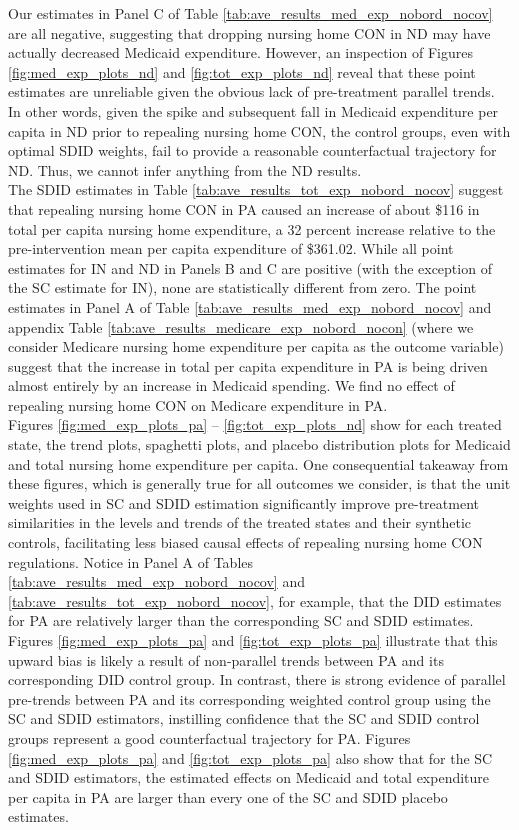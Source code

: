 \documentclass[../Main.tex]{subfiles}
\begin{document}
\indent Our estimates in Panel C of Table \ref{tab:ave_results_med_exp_nobord_nocov} are all negative, suggesting that dropping nursing home CON in ND may have actually decreased Medicaid expenditure. However, an inspection of Figures \ref{fig:med_exp_plots_nd} and \ref{fig:tot_exp_plots_nd} reveal that these point estimates are unreliable given the obvious lack of pre-treatment parallel trends. In other words, given the spike and subsequent fall in Medicaid expenditure per capita in ND prior to repealing nursing home CON, the control groups, even with optimal SDID weights, fail to provide a reasonable counterfactual trajectory for ND. Thus, we cannot infer anything from the ND results.\\
\indent The SDID estimates in Table \ref{tab:ave_results_tot_exp_nobord_nocov} suggest that repealing nursing home CON in PA caused an increase of about \$116 in total per capita nursing home expenditure, a 32 percent increase relative to the pre-intervention mean per capita expenditure of \$361.02. While all point estimates for IN and ND in Panels B and C are positive (with the exception of the SC estimate for IN), none are statistically different from zero. The point estimates in Panel A of Table \ref{tab:ave_results_med_exp_nobord_nocov} and appendix Table \ref{tab:ave_results_medicare_exp_nobord_nocon} (where we consider Medicare nursing home expenditure per capita as the outcome variable) suggest that the increase in total per capita expenditure in PA is being driven almost entirely by an increase in Medicaid spending. We find no effect of repealing nursing home CON on Medicare expenditure in PA. \\
\indent Figures \ref{fig:med_exp_plots_pa} -- \ref{fig:tot_exp_plots_nd} show for each treated state, the trend plots, spaghetti plots, and placebo distribution plots for Medicaid and total nursing home expenditure per capita. One consequential takeaway from these figures, which is generally true for all outcomes we consider, is that the unit weights used in SC and SDID estimation significantly improve pre-treatment similarities in the levels and trends of the treated states and their synthetic controls, facilitating less biased causal effects of repealing nursing home CON regulations. Notice in Panel A of Tables \ref{tab:ave_results_med_exp_nobord_nocov} and \ref{tab:ave_results_tot_exp_nobord_nocov}, for example, that the DID estimates for PA are relatively larger than the corresponding SC and SDID estimates. Figures \ref{fig:med_exp_plots_pa} and \ref{fig:tot_exp_plots_pa} illustrate that this upward bias is likely a result of non-parallel trends between PA and its corresponding DID control group. In contrast, there is strong evidence of parallel pre-trends between PA and its corresponding weighted control group using the SC and SDID estimators, instilling confidence that the SC and SDID control groups represent a good counterfactual trajectory for PA. Figures \ref{fig:med_exp_plots_pa} and \ref{fig:tot_exp_plots_pa} also show that for the SC and SDID estimators, the estimated effects on Medicaid and total expenditure per capita in PA are larger than every one of the SC and SDID placebo estimates.\\
\end{document}
